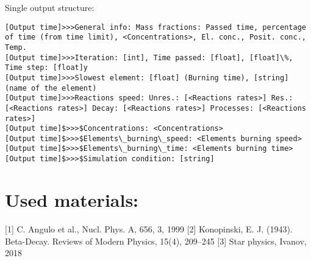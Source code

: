 \documentclass[a4paper,12pt]{article}
\begin{document}
Single output structure:

\begin{tiny}
\begin{verbatim}
[Output time]>>>General info: Mass fractions: Passed time, percentage of time (from time limit), <Concentrations>, El. conc., Posit. conc., Temp.
[Output time]>>>Iteration: [int], Time passed: [float], [float]\%, Time step: [float]y
[Output time]>>>Slowest element: [float] (Burning time), [string] (name of the element)
[Output time]>>>Reactions speed: Unres.: [<Reactions rates>] Res.: [<Reactions rates>] Decay: [<Reactions rates>] Processes: [<Reactions rates>]
[Output time]$>>>$Concentrations: <Concentrations>
[Output time]$>>>$Elements\_burning\_speed: <Elements burning speed>
[Output time]$>>>$Elements\_burning\_time: <Elements burning time>
[Output time]$>>>$Simulation condition: [string]
\end{verbatim}
\end{tiny}

\section{Used materials:}

[1] C. Angulo et al., Nucl. Phys. A, 656, 3, 1999
[2] Konopinski, E. J. (1943). Beta-Decay. Reviews of Modern Physics, 15(4), 209–245
[3] Star physics, Ivanov, 2018
\end{document}
